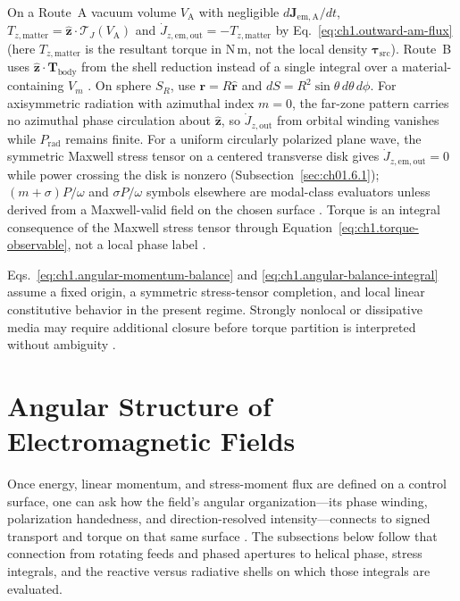 On a Route~A vacuum volume $V_{\mathrm{A}}$ with negligible $d\mathbf{J}_{\mathrm{em,A}}/dt$,
\(T_{z,\mathrm{matter}}=\hat{\mathbf{z}}\cdot\boldsymbol{\mathcal{T}}_J(V_{\mathrm{A}})\)
and \(\dot J_{z,\mathrm{em,out}}=-T_{z,\mathrm{matter}}\) by Eq.~\eqref{eq:ch1.outward-am-flux} (here $T_{z,\mathrm{matter}}$ is the resultant torque in N\,m, not the local density $\boldsymbol{\tau}_{\mathrm{src}}$). Route~B uses \(\hat{\mathbf{z}}\cdot\mathbf{T}_{\mathrm{body}}\) from the shell reduction instead of a single integral over a material-containing $V_m$ \cite{harrington2001}.
On sphere \(S_R\), use \(\mathbf{r}=R\hat{\mathbf{r}}\) and
\(dS=R^2\sin\theta\,d\theta\,d\phi\). For axisymmetric radiation with azimuthal index $m=0$, the far-zone pattern carries no azimuthal phase circulation about $\hat{\mathbf{z}}$, so $\dot J_{z,\mathrm{out}}$ from orbital winding vanishes while $P_{\mathrm{rad}}$ remains finite. For a uniform circularly polarized plane wave, the symmetric Maxwell stress tensor on a centered transverse disk gives $\dot J_{z,\mathrm{em,out}}=0$ while power crossing the disk is nonzero (Subsection~\ref{sec:ch01.6.1}); $(m+\sigma)P/\omega$ and $\sigma P/\omega$ symbols elsewhere are modal-class evaluators unless derived from a Maxwell-valid field on the chosen surface \cite{beth1936,stratton1941}.
Torque is an integral consequence of the Maxwell stress tensor through Equation~\eqref{eq:ch1.torque-observable}, not a local phase label
\cite{stratton1941}.

Eqs.~\eqref{eq:ch1.angular-momentum-balance}
and \eqref{eq:ch1.angular-balance-integral} assume a fixed origin, a symmetric
stress-tensor completion, and local linear constitutive behavior in the present
regime. Strongly nonlocal or dissipative media may require additional closure before
torque partition is interpreted without ambiguity \cite{stratton1941}.

\section{Angular Structure of Electromagnetic Fields}
\label{sec:ch01.2}

Once energy, linear momentum, and stress-moment flux are defined on a control surface, one can ask how the field's angular organization---its phase winding, polarization handedness, and direction-resolved intensity---connects to signed transport and torque on that same surface \cite{allen1992,stratton1941,beth1936}. The subsections below follow that connection from rotating feeds and phased apertures to helical phase, stress integrals, and the reactive versus radiative shells on which those integrals are evaluated.
